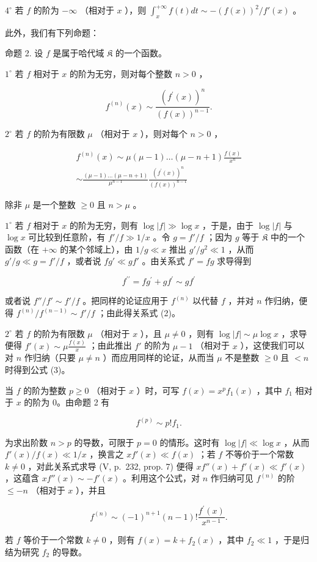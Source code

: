 \(4^{\circ}\) 若 \(f\) 的阶为 \(-\infty\) （相对于 \(x\) ），则 \(\int_{x}^{+\infty} f(t) dt \sim -(f(x))^{2} / f'(x)\) 。

此外，我们有下列命题：

命题 2. 设 \(f\) 是属于哈代域 \(\mathfrak{K}\) 的一个函数。

\(1^{\circ}\) 若 \(f\) 相对于 \(x\) 的阶为无穷，则对每个整数 \(n > 0\) ，

\[
f ^ {(n)} (x) \sim \frac {(f ^ {\prime} (x)) ^ {n}}{(f (x)) ^ {n - 1}}.\tag{2}
\]

\(2^{\circ}\) 若 \(f\) 的阶为有限数 \(\mu\) （相对于 \(x\) ），则对每个 \(n > 0\) ，

\[
\begin{array}{c} f ^ {(n)} (x) \sim \mu (\mu - 1) \ldots (\mu - n + 1) \frac {f (x)}{x ^ {n}} \\ \sim \frac {(\mu - 1) \ldots (\mu - n + 1)}{\mu^ {n - 1}} \frac {(f ^ {\prime} (x)) ^ {n}}{(f (x)) ^ {n - 1}} \end{array}\tag{3}
\]

除非 \(\mu\) 是一个整数 \(\geqslant 0\) 且 \(n > \mu\) 。

\(1^{\circ}\) 若 \(f\) 相对于 \(x\) 的阶为无穷，则有 \(\log |f| \gg \log x\) ，于是，由于 \(\log |f|\) 与 \(\log x\) 可比较到任意阶，有 \(f'/f \gg 1/x\) 。令 \(g = f'/f\) ；因为 \(g\) 等于 \(\mathfrak{K}\) 中的一个函数（在 \(+\infty\) 的某个邻域上），由 \(1/g \ll x\) 推出 \(g'/g^{2} \ll 1\) ，从而 \(g'/g \ll g = f'/f\) ，或者说 \(fg' \ll gf'\) 。由关系式 \(f' = fg\) 求导得到

\[
f ^ {\prime \prime} = f g ^ {\prime} + g f ^ {\prime} \sim g f ^ {\prime}
\]

或者说 \(f'' / f' \sim f' / f\) 。把同样的论证应用于 \(f^{(n)}\) 以代替 \(f\) ，并对 \(n\) 作归纳，便得 \(f^{(n)} / f^{(n-1)} \sim f' / f\) ；由此得关系式 (2)。

\(2^{\circ}\) 若 \(f\) 的阶为有限数 \(\mu\) （相对于 \(x\) ），且 \(\mu \neq 0\) ，则有 \(\log |f| \sim \mu \log x\) ，求导便得 \(f'(x) \sim \mu \frac{f(x)}{x}\) ；由此推出 \(f'\) 的阶为 \(\mu - 1\) （相对于 \(x\) ），这使我们可以对 \(n\) 作归纳（只要 \(\mu \neq n\) ）而应用同样的论证，从而当 \(\mu\) 不是整数 \(\geqslant 0\) 且 \(< n\) 时得到公式 (3)。

当 \(f\) 的阶为整数 \(p \geqslant 0\) （相对于 \(x\) ）时，可写 \(f(x) = x^p f_1(x)\) ，其中 \(f_1\) 相对于 \(x\) 的阶为 0。由命题 2 有

\[
f ^ {(p)} \sim p! f _ {1}.
\]

为求出阶数 \(n > p\) 的导数，可限于 \(p = 0\) 的情形。这时有 \(\log |f| \ll \log x\) ，从而 \(f'(x) / f(x) \ll 1 / x\) ，换言之 \(xf'(x) \ll f(x)\) ；若 \(f\) 不等价于一个常数 \(k \neq 0\) ，对此关系式求导 (V, p.~232, prop. 7) 便得 \(xf''(x) + f'(x) \ll f'(x)\) ，这蕴含 \(xf''(x) \sim -f'(x)\) 。利用这个公式，对 \(n\) 作归纳可见 \(f^{(n)}\) 的阶 \(\leqslant -n\) （相对于 \(x\) ），并且

\[
f ^ {(n)} \sim (- 1) ^ {n + 1} (n - 1)! \frac {f ^ {\prime} (x)}{x ^ {n - 1}}.\tag{4}
\]

若 \(f\) 等价于一个常数 \(k \neq 0\) ，则有 \(f(x) = k + f_2(x)\) ，其中 \(f_2 \ll 1\) ，于是归结为研究 \(f_2\) 的导数。

